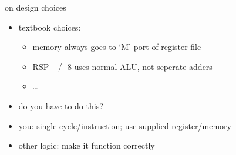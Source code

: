 \begin{frame}{on design choices}
    \begin{itemize}
    \item textbook choices:
        \begin{itemize}
        \item memory always goes to `M' port of register file
        \item RSP +/- 8 uses normal ALU, not seperate adders
        \item \ldots
        \end{itemize}
    \item do you have to do this? 
    \vspace{.5cm}
    \item you: single cycle/instruction; use supplied register/memory
    \item other logic: make it function correctly
    \end{itemize}
\end{frame}

